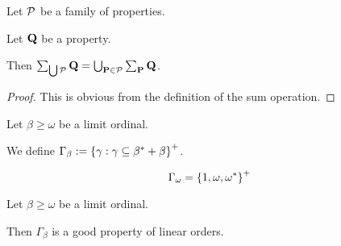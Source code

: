 \begin{lemma}
  Let $\mathcal{P}$ be a family of properties.

  Let $\mathbf{Q}$ be a property.

  Then $\sum_{\bigcup \mathcal{P}}{\mathbf{Q}} = \bigcup_{\mathbf{P} \in \mathcal{P}}{\sum_{\mathbf{P}}{\mathbf{Q}}}$.
\end{lemma}

\begin{proof}
  This is obvious from the definition of the sum operation.
\end{proof}


\begin{definition}
  Let $\beta \ge \omega$ be a limit ordinal.

  We define $\Gamma_{\beta} := \left\{ {\gamma : \gamma \subseteq \beta^\ast + \beta} \right\}^+$.
\end{definition}

\begin{example}
  \[
    \Gamma_{\omega} = \left\{ {1, \omega, \omega^\ast} \right\}^+
  \]
\end{example}

\begin{observation}
  Let $\beta \ge \omega$ be a limit ordinal.

  Then $\Gamma_{\beta}$ is a good property of linear orders.
\end{observation}